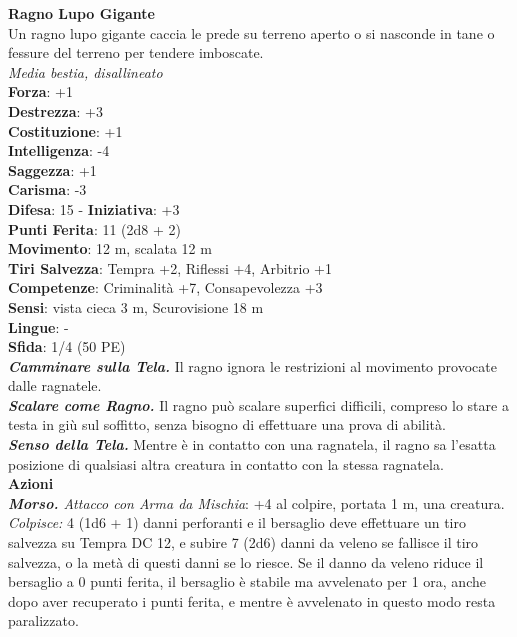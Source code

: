 \begin{multicols}{2}
\medskip\textbf{Ragno Lupo Gigante}\\
Un ragno lupo gigante caccia le prede su terreno aperto o si nasconde in tane o fessure del terreno per tendere imboscate.\\
\emph{Media bestia, disallineato}\\
\textbf{Forza}: +1\\
\textbf{Destrezza}: +3\\
\textbf{Costituzione}: +1\\
\textbf{Intelligenza}: -4\\
\textbf{Saggezza}: +1\\
\textbf{Carisma}: -3\\
\textbf{Difesa}: 15 - \textbf{Iniziativa}: +3\\
\textbf{Punti Ferita}: 11 (2d8 + 2)\\
\textbf{Movimento}: 12 m, scalata 12 m\\
\textbf{Tiri Salvezza}:  Tempra +2, Riflessi +4, Arbitrio +1 \\
\textbf{Competenze}: Criminalità +7, Consapevolezza +3\\
\textbf{Sensi}: vista cieca 3 m, Scurovisione 18 m\\
\textbf{Lingue}: -\\
\textbf{Sfida}: 1/4 (50 PE)\smallskip\\
\emph{\textbf{Camminare sulla Tela.}} Il ragno ignora le restrizioni al movimento provocate dalle ragnatele.\\
\emph{\textbf{Scalare come Ragno.}} Il ragno può scalare superfici difficili, compreso lo stare a testa in giù sul soffitto, senza bisogno di effettuare una prova di abilità.\\
\emph{\textbf{Senso della Tela.}} Mentre è in contatto con una ragnatela, il ragno sa l'esatta posizione di qualsiasi altra creatura in contatto con la stessa ragnatela.\\
\smallskip\textbf{Azioni}\\
\emph{\textbf{Morso.} Attacco con Arma da Mischia}: +4 al colpire, portata 1 m, una creatura.\\
\emph{Colpisce:} 4 (1d6 + 1) danni perforanti e il bersaglio deve effettuare un tiro salvezza su Tempra DC  12, e subire 7 (2d6) danni da veleno se fallisce il tiro salvezza, o la metà di questi danni se lo riesce. Se il danno da veleno riduce il bersaglio a 0 punti ferita, il bersaglio è stabile ma avvelenato per 1 ora, anche dopo aver recuperato i punti ferita, e mentre è avvelenato in questo modo resta paralizzato.\\


\end{multicols}
